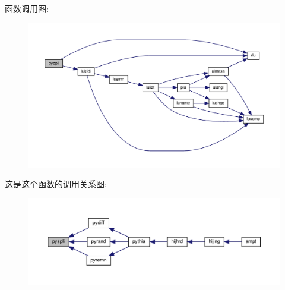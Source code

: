 函数调用图\+:
\nopagebreak
\begin{figure}[H]
\begin{center}
\leavevmode
\includegraphics[width=350pt]{pyspli_8f90_a4ae9e84695eaec96205a586a9cbd2b11_cgraph}
\end{center}
\end{figure}
这是这个函数的调用关系图\+:
\nopagebreak
\begin{figure}[H]
\begin{center}
\leavevmode
\includegraphics[width=350pt]{pyspli_8f90_a4ae9e84695eaec96205a586a9cbd2b11_icgraph}
\end{center}
\end{figure}

